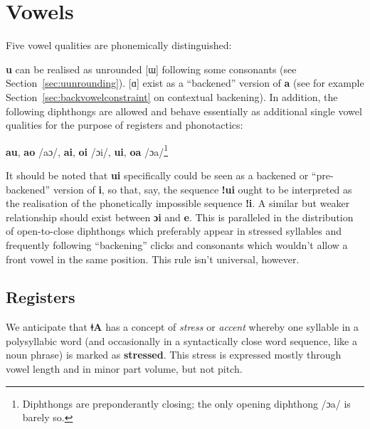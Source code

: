 \documentclass[11pt,a5paper]{book}
\newcommand{\qcn}[1]{\textcolor{AccentText}{\large\textbf{#1}}}
\newcommand{\langname}{\qcn{ǂA}}
\begin{document}
\section{Vowels}

Five vowel qualities are phonemically distinguished:

\begin{center}
    \begin{vowel}
        \putcvowel{\qcn{i}}{1}
        \putcvowel{\qcn{e}}{2}
        \putcvowel{\qcn{a}}{4}
        \putcvowel{\qcn{o} /ɔ/}{6}
        \putcvowel{\qcn{u} /u\textasciitilde{}ɯ/}{8}
    \end{vowel}
\end{center}

\qcn{u} can be realised as unrounded [ɯ] following some consonants (see Section~\ref{sec:uunrounding}). [ɑ] exist as a ``backened'' version of \qcn{a} (see for example Section~\ref{sec:backvowelconstraint} on contextual backening). In addition, the following diphthongs are allowed and behave essentially as additional single vowel qualities for the purpose of registers and phonotactics:

\begin{center}
\qcn{au}, \qcn{ao} /aɔ/, \qcn{ai}, \qcn{oi} /ɔi/, \qcn{ui}, \qcn{oa} /ɔa/\footnote{Diphthongs are preponderantly closing; the only opening diphthong /ɔa/ is barely so.}
\end{center}

It should be noted that \qcn{ui} specifically could be seen as a backened or ``pre-backened'' version of \qcn{i}, so that, say, the sequence \qcn{ǃui} ought to be interpreted as the realisation of the phonetically impossible sequence \qcn{ǃi}. A similar but weaker relationship should exist between \qcn{ɔi} and \qcn{e}. This is paralleled in the distribution of open-to-close diphthongs which preferably appear in stressed syllables and frequently following ``backening'' clicks and consonants which wouldn't allow a front vowel in the same position. This rule isn't universal, however.

\subsection{Registers}

We anticipate that \langname{} has a concept of \emph{stress} or \emph{accent} whereby one syllable in a polysyllabic word (and occasionally in a syntactically close word sequence, like a noun phrase) is marked as \textbf{stressed}. This stress is expressed mostly through vowel length and in minor part volume, but not pitch.
\end{document}
